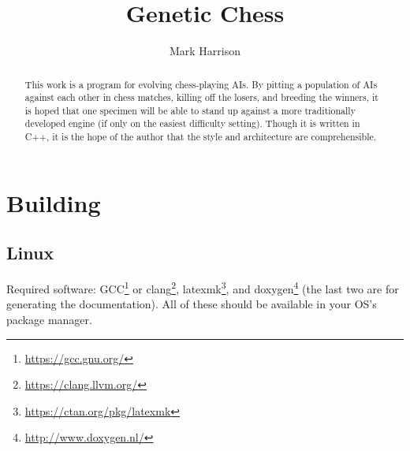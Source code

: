 \documentclass[letterpaper]{article}
\title{Genetic Chess}
\author{Mark Harrison}
\date{}
\newcommand{\cpp}{C{\nobreak+}{\nobreak+}}
\renewcommand{\_}{\allowbreak\textunderscore\allowbreak}
\begin{document}
\maketitle

\begin{abstract}
This work is a program for evolving chess-playing AIs.  By pitting a population of AIs against each other in chess matches, killing off the losers, and breeding the winners, it is hoped that one specimen will be able to stand up against a more traditionally developed engine (if only on the easiest difficulty setting). Though it is written in \cpp{}, it is the hope of the author that the style and architecture are comprehensible.
\end{abstract}

\tableofcontents{}


\section{Building}

\subsection{Linux}
Required software: GCC\footnote{\url{https://gcc.gnu.org/}} or clang\footnote{\url{https://clang.llvm.org/}}, latexmk\footnote{\url{https://ctan.org/pkg/latexmk}}, and doxygen\footnote{\label{doxygen-footnote}\url{http://www.doxygen.nl/}} (the last two are for generating the documentation). All of these should be available in your OS's package manager.
\end{document}
